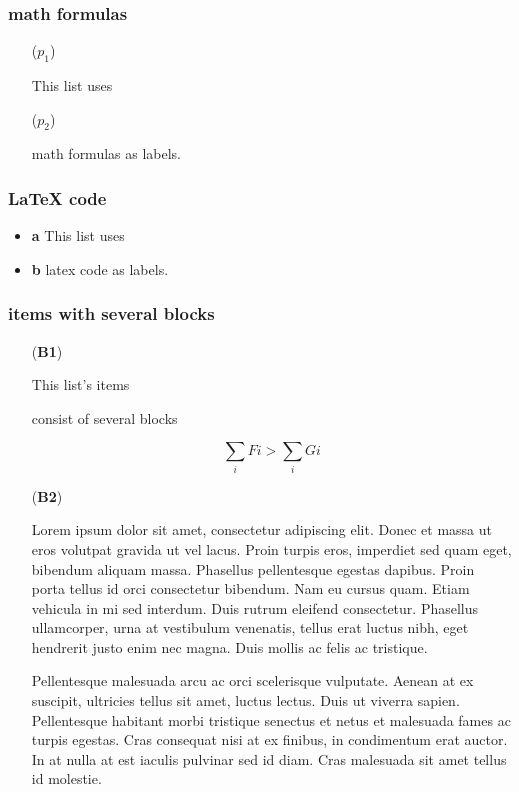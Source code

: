 \hypertarget{math-formulas}{%
\subsubsection{math formulas}\label{math-formulas}}

\begin{itemize}
\tightlist

\item[(\(p_1\))]

This list uses

\item[(\(p_2\))]

math formulas as labels.

\end{itemize}

\hypertarget{latex-code}{%
\subsubsection{LaTeX code}\label{latex-code}}

\begin{itemize}
\tightlist
\item
  {\textbf{a}} This list uses
\item
  {\textbf{b}} latex code as labels.
\end{itemize}

\hypertarget{items-with-several-blocks}{%
\subsubsection{items with several
blocks}\label{items-with-several-blocks}}

\begin{itemize}
\tightlist

\item[(\textbf{B1})]

This list's items

consist of several blocks

\[\sum_i Fi > \sum_i Gi\]

\item[(\textbf{B2})]

Lorem ipsum dolor sit amet, consectetur adipiscing elit. Donec et massa
ut eros volutpat gravida ut vel lacus. Proin turpis eros, imperdiet sed
quam eget, bibendum aliquam massa. Phasellus pellentesque egestas
dapibus. Proin porta tellus id orci consectetur bibendum. Nam eu cursus
quam. Etiam vehicula in mi sed interdum. Duis rutrum eleifend
consectetur. Phasellus ullamcorper, urna at vestibulum venenatis, tellus
erat luctus nibh, eget hendrerit justo enim nec magna. Duis mollis ac
felis ac tristique.

Pellentesque malesuada arcu ac orci scelerisque vulputate. Aenean at ex
suscipit, ultricies tellus sit amet, luctus lectus. Duis ut viverra
sapien. Pellentesque habitant morbi tristique senectus et netus et
malesuada fames ac turpis egestas. Cras consequat nisi at ex finibus, in
condimentum erat auctor. In at nulla at est iaculis pulvinar sed id
diam. Cras malesuada sit amet tellus id molestie.

\end{itemize}

